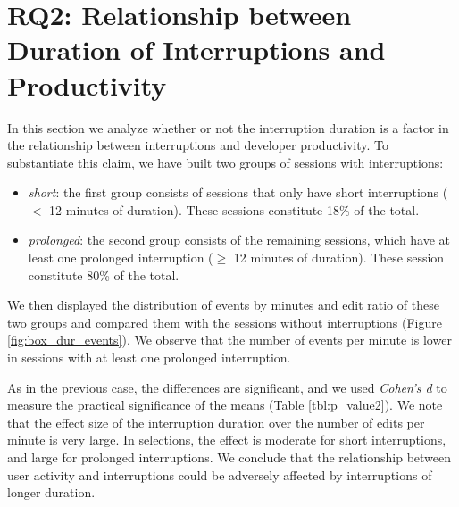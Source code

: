\documentclass[times]{smrauth}
\begin{document}
\section{RQ2: Relationship between Duration of Interruptions and Productivity}

In this section we analyze whether or not the interruption duration is a factor in the relationship between interruptions and developer productivity. To substantiate this claim, we have built two groups of sessions with interruptions:
\begin{itemize}
\item \textit{short}: the first group consists of sessions that only have short interruptions ($<$ 12 minutes of duration). These sessions constitute 18\% of the total.
\item \textit{prolonged}: the second group consists of the remaining sessions, which have at least one prolonged interruption ($\geq$ 12 minutes of duration). These session constitute 80\% of the total.
\end{itemize} 

We then displayed the distribution of events by minutes and edit ratio of these two groups and compared them with the sessions without interruptions (Figure \ref{fig:box_dur_events}). We observe that the number of events per minute is lower in sessions with at least one prolonged interruption. 

As in the previous case, the differences are significant, and we used \textit{Cohen's d} to measure the practical significance of the means (Table \ref{tbl:p_value2}). We note that the effect size of the interruption duration over the number of edits per minute is very large. In selections, the effect is moderate for short interruptions, and large for prolonged interruptions. We conclude that the relationship between user activity and interruptions could be adversely affected by interruptions of longer duration. 
\end{document}
